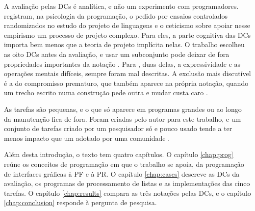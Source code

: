A avaliação pelas DCs é analítica, e não um experimento com programadores.
\textcite[p. 58 e 60]{blackwell2019} registram, na psicologia da
programação, o pedido por ensaios controlados randomizados no estudo do
projeto de linguagens e o ceticismo sobre apoiar nesse empirismo um
processo de projeto complexo.
Para eles, a parte cognitiva das DCs importa bem menos que a teoria de
projeto implícita nelas.
O trabalho escolheu as oito DCs antes da avaliação, e usar um subconjunto
pode deixar de fora propriedades importantes da notação \cite{britton2001}.
Para \textcite[p. 334]{green2006}, duas delas, a expressividade e as
operações mentais difíceis, sempre foram mal descritas.
A exclusão mais discutível é a do compromisso prematuro, que também
aparece na própria notação, quando um trecho escrito numa construção
pede outra e mudar custa caro \cite{green1996d}.

As tarefas são pequenas, e o que só aparece em programas grandes ou ao
longo da manutenção fica de fora.
Foram criadas pelo autor para este trabalho, e um conjunto de tarefas
criado por um pesquisador só e pouco usado tende a ter menos impacto que
um adotado por uma comunidade \cite{sim2003}.

Além desta introdução, o texto tem quatro capítulos.
O capítulo \ref{chap:prog} reúne os conceitos de programação em que o
trabalho se apoia, da programação de interfaces gráficas à PF e à PR.
O capítulo \ref{chap:cases} descreve as DCs da avaliação, os programas de
processamento de listas e as implementações das cinco tarefas.
O capítulo \ref{chap:results} compara as três notações pelas DCs, e o
capítulo \ref{chap:conclusion} responde à pergunta de pesquisa.
